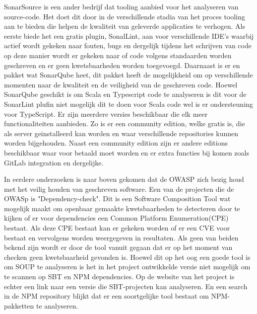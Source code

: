 SonarSource is een ander bedrijf dat tooling aanbied voor het analyseren van source-code. Het doet dit door in de verschillende stadia van het proces tooling aan te bieden die helpen de kwaliteit van geleverde applicaties te verhogen. Als eerste biede het een gratis plugin, SonalLint, aan voor verschillende IDE's waarbij actief wordt gekeken naar fouten, bugs en dergelijk tijdens het schrijven van code op deze manier wordt er gekeken naar of code volgens standaarden worden geschreven en er geen kwetsbaarheden worden toegevoegd. Daarnaast is er en pakket wat SonarQube heet, dit pakket heeft de mogelijkheid om op verschillende momenten naar de kwaliteit en de veiligheid van de geschreven code. Hoewel SonarQube geschikt is om Scala en Typescript code te analyseren is dit voor de SonarLint plufin niet mogelijk dit te doen voor Scala code wel is er ondersteuning voor TypeScript. Er zijn meerdere versies beschikbaar die elk meer functionaliteiten aanbieden. Zo is er een community edition, welke gratis is, die als server geinstalleerd kan worden en waar verschillende repositories kunnen worden bijgehouden. Naast een community edition zijn er andere editions beschikbaar waar voor betaald moet worden en er extra functies bij komen zoals GitLab integration en dergelijke.

In eerdere onderzoeken is naar boven gekomen dat de OWASP zich bezig houd met het veilig houden van geschreven software. Een van de projecten die de OWASp is "Dependency-check". Dit is een Software Composition Tool wat mogelijk maakt om openbaar gemaakte kwetsbaarheden te detecteren door te kijken of er voor dependencies een Common Platform Enumeration(CPE) bestaat. Als deze CPE bestaat kan er gekeken worden of er een CVE voor bestaat en vervolgens worden weergegeven in resultaten. Als geen van beiden bekend zijn wordt er door de tool vanuit gegaan dat er op het moment van checken geen kwetsbaarheid gevonden is. Hoewel dit op het oog een goede tool is om SOUP te analyseren is het in het project ontwikkelde versie niet mogelijk om te scannen op SBT en NPM dependencies. Op de website van het project is echter een link naar een versie die SBT-projecten kan analyseren. En een search in de NPM repository blijkt dat er een soortgelijke tool bestaat om NPM-pakketten te analyseren.


%
%


